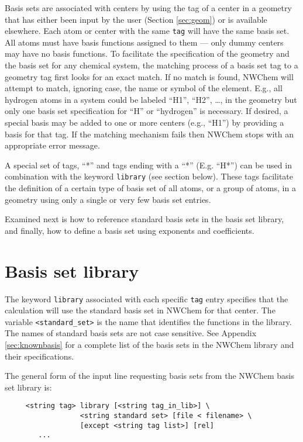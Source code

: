 Basis sets are associated with centers by using the tag of a center in
a geometry that has either been input by the user (Section
\ref{sec:geom}) or is available elsewhere.  Each atom or center with
the same \verb+tag+ will have the same basis set.  All atoms must have
basis functions assigned to them --- only dummy centers may have no
basis functions.  To facilitate the specification of the geometry and
the basis set for any chemical system, the matching process of a basis
set tag to a geometry tag first looks for an exact match.  If no match
is found, NWChem will attempt to match, ignoring case, the name or
symbol of the element.  E.g., all hydrogen atoms in a system could be
labeled ``H1'', ``H2'', \ldots, in the geometry but only
one basis set specification for ``H'' or ``hydrogen'' is necessary.
If desired, a special basis may be added to one or more centers (e.g.,
``H1'') by providing a basis for that tag.
If the matching mechanism fails then NWChem stops with an appropriate
error message.

A special set of tags, ``*'' and tags ending with a ``*'' (E.g. ``H*'')
can be used in combination with the keyword \verb+library+ (see section
below). These tags facilitate the definition of a certain type of basis 
set of all atoms, or a group of atoms, in a geometry using only a single 
or very few basis set entries.

Examined next is how to reference standard basis sets in the basis set
library, and finally, how to define a basis set using exponents and
coefficients.

\section{Basis set library}

The keyword \verb+library+ associated with each specific \verb+tag+
entry specifies that the calculation will use the standard basis set
in NWChem for that center.  The variable \verb+<standard_set>+ is the
name that identifies the functions in the library.  The names of
standard basis sets are not case sensitive.  See Appendix
\ref{sec:knownbasis} for a complete list of the basis sets in the
NWChem library and their specifications.  

The general form of the input line requesting basis sets from the NWChem
basis set library is:
\begin{verbatim}
     <string tag> library [<string tag_in_lib>] \
                  <string standard set> [file < filename> \
                  [except <string tag list>] [rel]
        ...
\end{verbatim}

